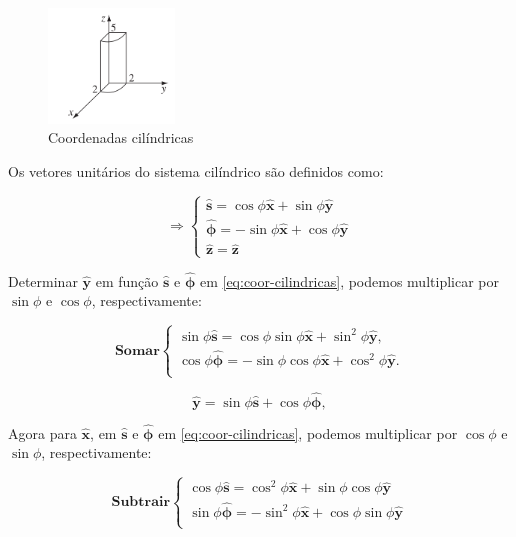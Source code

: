 \documentclass[a4paper,12pt]{article}
\begin{document}
\begin{figure}[htbp]
    \centering
    \includegraphics[width=0.3\textwidth]{images/cilindro.png}
    \caption{Coordenadas cilíndricas}
    \label{fig:exemplo}
\end{figure}


Os vetores unitários do sistema cilíndrico são definidos como:

\begin{equation}\label{eq:coor-cilindricas}
\Rightarrow
\begin{cases}
\hat{\mathbf{s}} = \cos\phi \hat{\mathbf{x}} + \sin\phi \hat{\mathbf{y}} \\
\hat{\bm{\phi}} = -\sin\phi \hat{\mathbf{x}} + \cos\phi \hat{\mathbf{y}} \\
\hat{\bm{z}} = \hat{\bm{z}}
\end{cases}
\end{equation}

Determinar $\hat{\mathbf{y}}$ em função $\hat{\mathbf{s}}$ e $\hat{\bm{\phi}}$ em \ref{eq:coor-cilindricas}, podemos multiplicar
por $\sin\phi$ e $\cos\phi$, respectivamente:

\begin{equation}
\mathbf{Somar}
\begin{cases}
    \sin\phi\hat{\mathbf{s}} = \cos\phi\sin\phi \hat{\mathbf{x}} + \sin^{2}\phi \hat{\mathbf{y}}, \\
    \cos\phi\hat{\bm{\phi}} = -\sin\phi\cos\phi \hat{\mathbf{x}} + \cos^{2}\phi \hat{\mathbf{y}}. \\
\end{cases}
\end{equation}

\begin{equation}
    \hat{\mathbf{y}} = \sin\phi \hat{\mathbf{s}} + \cos\phi \hat{\bm{\phi}},
\end{equation}

Agora para $\hat{\mathbf{x}}$, em $\hat{\mathbf{s}}$ e $\hat{\bm{\phi}}$ em \ref{eq:coor-cilindricas}, podemos multiplicar
por $\cos\phi$ e $\sin\phi$, respectivamente:

\begin{equation}
\mathbf{Subtrair}
\begin{cases}
    \cos\phi\hat{\mathbf{s}} = \cos^{2}\phi \hat{\mathbf{x}} + \sin\phi\cos\phi \hat{\mathbf{y}} \\
    \sin\phi\hat{\bm{\phi}} = -\sin^{2}\phi\hat{\mathbf{x}} + \cos\phi \sin\phi \hat{\mathbf{y}} \\
\end{cases}
\end{equation}
\end{document}
